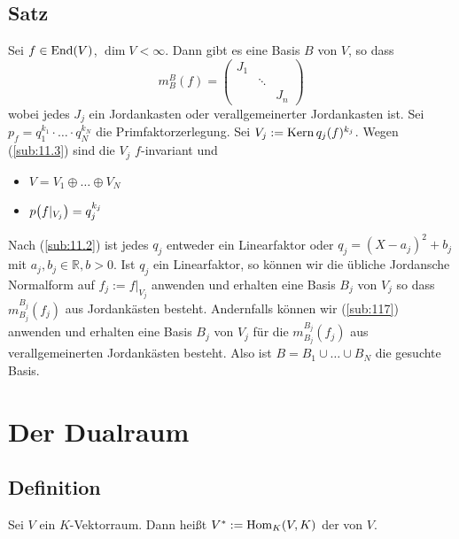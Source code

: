 \subsection[Satz: Jordansche Normalform über $\mathds{R}$]{Satz} %
\label{sub:119}
Sei $f \in \operatorname{End}(V)$, $\dim V < \infty$. Dann gibt es eine Basis $B$ von $V$, so dass 
\[
	m_B^B (f) = \begin{pmatrix}
		J_1 & & \\
		& \ddots & \\
		& & J_n
	\end{pmatrix}
\]
wobei jedes $J_j$ ein Jordankasten oder verallgemeinerter Jordankasten ist.
Sei $p_f = q_1^{k_1} \cdot \ldots \cdot q_N^{k_N}$ die Primfaktorzerlegung. Sei $V_j := \operatorname{Kern} q_j(f)^{k_j}$. Wegen (\ref{sub:11.3}) sind die $V_j$ $f$-invariant und
\begin{itemize}
	\item $V= V_1 \oplus \ldots \oplus V_N$
	\item $p\enbrace*{f|_{V_j}} = q_j^{k_j}$
\end{itemize}
Nach (\ref{sub:11.2}) ist jedes $q_j$ entweder ein Linearfaktor oder $q_j = (X-a_j)^2 + b_j$ mit $a_j, b_j \in \mathds{R}, b>0$. Ist $q_j$ ein Linearfaktor, so können wir 
die übliche Jordansche Normalform  auf $f_j := f|_{V_j}$ anwenden und erhalten eine Basis $B_j$ von $V_j$ so dass $m_{B_j}^{B_j}(f_j)$ aus Jordankästen besteht. Andernfalls
können wir (\ref{sub:117}) anwenden und erhalten eine Basis $B_j $ von $V_j$ für die $m_{B_j}^{B_j} (f_j)$ aus verallgemeinerten Jordankästen besteht. Also ist 
$B= B_1 \cup \ldots \cup B_N$ die gesuchte Basis. \bewende

\newpage
\section{Der Dualraum} %
\label{sec:12}

\subsection[Definition: Dualraum]{Definition} %
\label{sub:121}
Sei $V$ ein $K$-Vektorraum. Dann heißt $V^* := \operatorname{Hom}_K (V,K)$ der  von $V$. 

